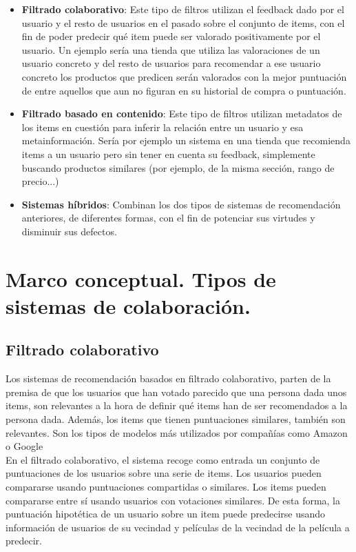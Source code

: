\begin{itemize}
    \item \textbf{Filtrado colaborativo}: Este tipo de filtros utilizan el feedback dado por el usuario y el resto de usuarios en el pasado sobre el conjunto de items, con el fin de poder predecir qué item puede ser valorado positivamente por el usuario. Un ejemplo sería una tienda que utiliza las valoraciones de un usuario concreto y del resto de usuarios para recomendar a ese usuario concreto los productos que predicen serán valorados con la mejor puntuación de entre aquellos que aun no figuran en su historial de compra o puntuación.
    \item \textbf{Filtrado basado en contenido}: Este tipo de filtros utilizan metadatos de los items en cuestión para inferir la relación entre un usuario y esa metainformación. Sería por ejemplo un sistema en una tienda que recomienda items a un usuario pero sin tener en cuenta su feedback, simplemente buscando productos similares (por ejemplo, de la misma sección, rango de precio...)
    \item \textbf{Sistemas híbridos}: Combinan los dos tipos de sistemas de recomendación anteriores, de diferentes formas, con el fin de potenciar sus virtudes y disminuir sus defectos.
\end{itemize}

\section{Marco conceptual. Tipos de sistemas de colaboración.}\label{sec:marcoconceptual}

\subsection{Filtrado colaborativo}

Los sistemas de recomendación basados en filtrado colaborativo, parten de la premisa de que los usuarios que han votado parecido que una persona dada unos items, son relevantes a la hora de definir qué items han de ser recomendados a la persona dada. Además, los items que tienen puntuaciones similares, también son relevantes. Son los tipos de modelos más utilizados por compañías como Amazon \cite{Amazon} o Google \cite{Google}\\

En el filtrado colaborativo, el sistema recoge como entrada un conjunto de puntuaciones de los usuarios sobre una serie de items. Los usuarios pueden compararse usando puntuaciones compartidas o similares. Los items pueden compararse entre sí usando usuarios con votaciones similares. De esta forma, la puntuación hipotética de un usuario sobre un item puede predecirse usando información de usuarios de su vecindad y películas de la vecindad de la película a predecir.\\

